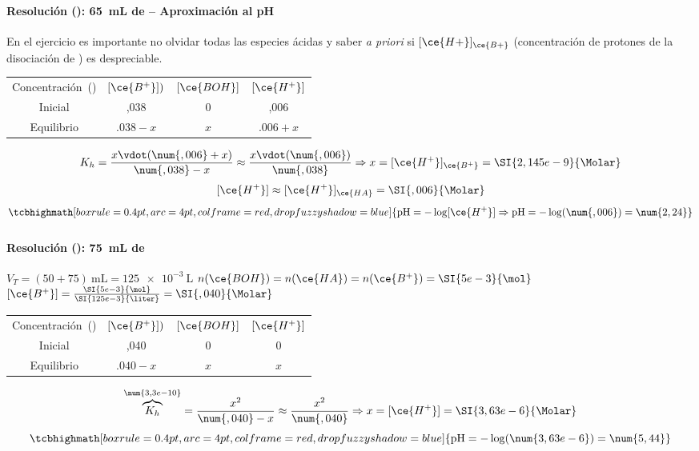 \begin{frame}
	\frametitle{\ejerciciocmd}
	\framesubtitle{Resolución (): \SI{65}{\milli\liter} de  -- Aproximación al pH}
	En el ejercicio es importante no olvidar todas las especies ácidas y saber \emph{a priori} si $[\ce{H+}]_{\ce{B+}}$ (concentración de protones de la disociación de ) es despreciable.
	\begin{center}
		\begin{tabular}{cSSS}
			\toprule
				Concentración~(\si{\Molar})	& {$[\ce{B^+}])$}						& {$[\ce{BOH}]$}		& {$[\ce{H^+}]$}					\\
				Inicial						& ,038				& 0						& ,006				\\
				Equilibrio					& {$\num{,038}-x$}	& {$x$}					& {$\num{,006}+x$}	\\
			\bottomrule
		\end{tabular}
	\end{center}
	$$
		K_h = \frac{x\vdot(\num{,006}+x)}{\num{,038}-x}\approx\frac{x\vdot(\num{,006})}{\num{,038}}\Rightarrow x=[\ce{H^+}]_{\ce{B^+}}=\SI{2,145e-9}{\Molar}
	$$
	$$
		[\ce{H^+}] \approx [\ce{H^+}]_{\ce{HA}}=\SI{,006}{\Molar}
	$$
	$$
		\tcbhighmath[boxrule=0.4pt,arc=4pt,colframe=red,drop fuzzy shadow=blue]{\text{pH}=-\log[\ce{H^+}]\Rightarrow\text{pH}=-\log(\num{,006})=\num{2,24}}
	$$
\end{frame}

\begin{frame}
	\frametitle{\ejerciciocmd}
	\framesubtitle{Resolución (): \SI{75}{\milli\liter} de }
	\quad$V_T=(50+75)~\si{\milli\liter}=\SI{125e-3}{\liter}$
	\quad$n(\ce{BOH})=n(\ce{HA})=n(\ce{B^+})=\SI{5e-3}{\mol}$
	\quad$[\ce{B^+}]=\frac{\SI{5e-3}{\mol}}{\SI{125e-3}{\liter}}=\SI{,040}{\Molar}$
	\begin{center}
		\begin{tabular}{cSSS}
			\toprule
				Concentración~(\si{\Molar})	& {$[\ce{B^+}])$}						& {$[\ce{BOH}]$}		& {$[\ce{H^+}]$}	\\
				Inicial						& ,040									& 0						& 0					\\
				Equilibrio					& {$\num{,040}-x$}						& {$x$}					& {$x$}				\\
			\bottomrule
		\end{tabular}
	\end{center}
	$$
		\overbrace{K_h}^{\num{3,3e-10}} = \frac{x^2}{\num{,040}-x}\approx\frac{x^2}{\num{,040}}\Rightarrow x=[\ce{H^+}]=\SI{3,63e-6}{\Molar}
	$$
	$$
		\tcbhighmath[boxrule=0.4pt,arc=4pt,colframe=red,drop fuzzy shadow=blue]{\text{pH}=-\log(\num{3,63e-6})=\num{5,44}}
	$$
\end{frame}

